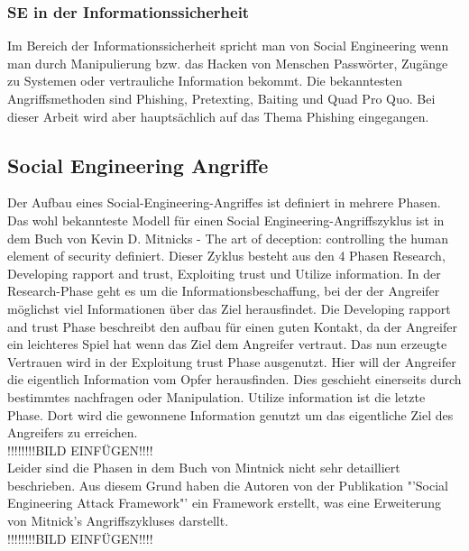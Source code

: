 \subsubsection{SE in der Informationssicherheit}
Im Bereich der Informationssicherheit spricht man von Social Engineering wenn man durch Manipulierung bzw. das Hacken von Menschen Passwörter, Zugänge zu Systemen oder vertrauliche Information bekommt. Die bekanntesten Angriffsmethoden sind Phishing, Pretexting, Baiting und Quad Pro Quo. Bei dieser Arbeit wird aber hauptsächlich auf das Thema Phishing eingegangen.

\subsection{Social Engineering Angriffe}

Der Aufbau eines Social-Engineering-Angriffes ist definiert in mehrere Phasen. Das wohl bekannteste Modell für einen Social Engineering-Angriffszyklus ist in dem Buch von Kevin D. Mitnicks - The art of deception: controlling the human element of security \cite{ArtOfDeception} definiert. Dieser Zyklus besteht aus den 4 Phasen Research, Developing rapport and trust, Exploiting trust und Utilize information.
In der Research-Phase geht es um die Informationsbeschaffung, bei der der Angreifer möglichst viel Informationen über das Ziel herausfindet. Die Developing rapport and trust Phase beschreibt den aufbau für einen guten Kontakt, da der Angreifer ein leichteres Spiel hat wenn das Ziel dem Angreifer vertraut. Das nun erzeugte Vertrauen wird in der Exploitung trust Phase ausgenutzt. Hier will der Angreifer die eigentlich Information vom Opfer herausfinden. Dies geschieht einerseits durch bestimmtes nachfragen oder Manipulation. Utilize information ist die letzte Phase. Dort wird die gewonnene Information genutzt um das eigentliche Ziel des Angreifers zu erreichen.\\

!!!!!!!!BILD EINFÜGEN!!!!\\

Leider sind die Phasen in dem Buch von Mintnick \cite{ArtOfDeception} nicht sehr detailliert beschrieben. Aus diesem Grund haben die Autoren von der Publikation "'Social Engineering Attack Framework"' \cite{AttackFramework} ein Framework erstellt, was eine Erweiterung von Mitnick's Angriffszykluses darstellt.\\

!!!!!!!!BILD EINFÜGEN!!!!\\

